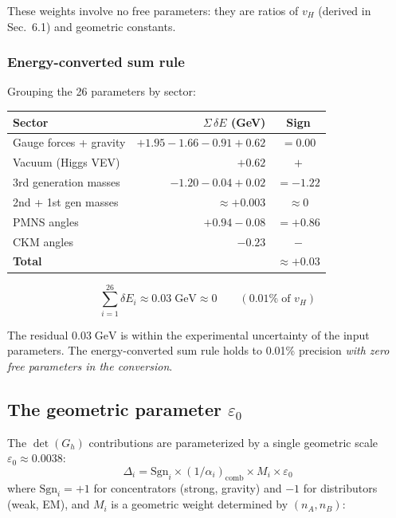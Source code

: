 \documentclass[12pt]{article}
\theoremstyle{remark}
\theoremstyle{definition}
\begin{document}
These weights involve no free parameters: they are ratios of $v_H$ (derived in Sec.~6.1) and geometric constants.

\subsubsection{Energy-converted sum rule}

Grouping the 26 parameters by sector:

\begin{center}
\begin{tabular}{lrc}
\hline
Sector & $\Sigma\,\delta E$ (GeV) & Sign \\
\hline
Gauge forces + gravity & $+1.95 - 1.66 - 0.91 + 0.62$ & $= 0.00$ \\
Vacuum (Higgs VEV) & $+0.62$ & $+$ \\
3rd generation masses & $-1.20 - 0.04 + 0.02$ & $= -1.22$ \\
2nd + 1st gen masses & $\approx +0.003$ & $\approx 0$ \\
PMNS angles & $+0.94 - 0.08$ & $= +0.86$ \\
CKM angles & $-0.23$ & $-$ \\
\hline
\textbf{Total} & & $\approx \mathbf{+0.03}$ \\
\hline
\end{tabular}
\end{center}

\begin{equation}
\boxed{\sum_{i=1}^{26} \delta E_i \approx 0.03\;\text{GeV} \approx 0 \qquad (0.01\%\;\text{of } v_H)}
\end{equation}

The residual $0.03\;\text{GeV}$ is within the experimental uncertainty of the input parameters. The energy-converted sum rule holds to 0.01\% precision \emph{with zero free parameters in the conversion}.

\subsection{The geometric parameter $\varepsilon_0$}

The $\det(G_h)$ contributions are parameterized by a single geometric scale $\varepsilon_0 \approx 0.0038$:
\begin{equation}
\Delta_i = \text{Sgn}_i \times (1/\alpha_i)_\text{comb} \times M_i \times \varepsilon_0
\end{equation}
where $\text{Sgn}_i = +1$ for concentrators (strong, gravity) and $-1$ for distributors (weak, EM), and $M_i$ is a geometric weight determined by $(n_A, n_B)$:
\end{document}
